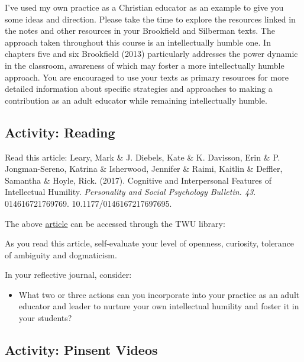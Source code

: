 \documentclass[
]{book}
\providecommand{\tightlist}{%
  \setlength{\itemsep}{0pt}\setlength{\parskip}{0pt}}
\begin{document}
I've used my own practice as a Christian educator as an example to give you some ideas and direction. Please take the time to explore the resources linked in the notes and other resources in your Brookfield and Silberman texts. The approach taken throughout this course is an intellectually humble one. In chapters five and six Brookfield (2013) particularly addresses the power dynamic in the classroom, awareness of which may foster a more intellectually humble approach. You are encouraged to use your texts as primary resources for more detailed information about specific strategies and approaches to making a contribution as an adult educator while remaining intellectually humble.

\hypertarget{activity-reading-2}{%
\subsection{Activity: Reading}\label{activity-reading-2}}

\begin{reflect}
Read this article: Leary, Mark \& J. Diebels, Kate \& K. Davisson, Erin
\& P. Jongman-Sereno, Katrina \& Isherwood, Jennifer \& Raimi, Kaitlin
\& Deffler, Samantha \& Hoyle, Rick. (2017). Cognitive and Interpersonal
Features of Intellectual Humility. \emph{Personality and Social
Psychology Bulletin. 43}. 014616721769769. 10.1177/0146167217697695.

The above
\href{https://journals-sagepub-com.ezproxy.student.twu.ca/doi/pdf/10.1177/0146167217697695?}{article}
can be accessed through the TWU library:

As you read this article, self-evaluate your level of openness,
curiosity, tolerance of ambiguity and dogmaticism.

In your reflective journal, consider:

\begin{itemize}
\tightlist
\item
  What two or three actions can you incorporate into your practice as an
  adult educator and leader to nurture your own intellectual humility
  and foster it in your students?
\end{itemize}
\end{reflect}

\hypertarget{activity-pinsent-videos}{%
\subsection{Activity: Pinsent Videos}\label{activity-pinsent-videos}}
\end{document}
